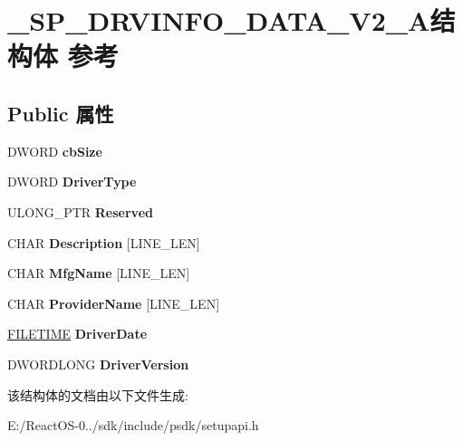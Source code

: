 \hypertarget{struct___s_p___d_r_v_i_n_f_o___d_a_t_a___v2___a}{}\section{\+\_\+\+S\+P\+\_\+\+D\+R\+V\+I\+N\+F\+O\+\_\+\+D\+A\+T\+A\+\_\+\+V2\+\_\+\+A结构体 参考}
\label{struct___s_p___d_r_v_i_n_f_o___d_a_t_a___v2___a}
\subsection*{Public 属性}
\begin{DoxyCompactItemize}
\item 
\mbox{\label{struct___s_p___d_r_v_i_n_f_o___d_a_t_a___v2___a_a2c6a6716f0a719d3f139a5f640356c9c}} 
D\+W\+O\+RD {\bfseries cb\+Size}
\item 
\mbox{\label{struct___s_p___d_r_v_i_n_f_o___d_a_t_a___v2___a_aa7d12cbd28a733abe24a8021cd836991}} 
D\+W\+O\+RD {\bfseries Driver\+Type}
\item 
\mbox{\label{struct___s_p___d_r_v_i_n_f_o___d_a_t_a___v2___a_a7f7d325142fc6d3ca09c727be30d73e6}} 
U\+L\+O\+N\+G\+\_\+\+P\+TR {\bfseries Reserved}
\item 
\mbox{\label{struct___s_p___d_r_v_i_n_f_o___d_a_t_a___v2___a_a1b92181e4b47020e864b9055dc78a9f3}} 
C\+H\+AR {\bfseries Description} \mbox{[}L\+I\+N\+E\+\_\+\+L\+EN\mbox{]}
\item 
\mbox{\label{struct___s_p___d_r_v_i_n_f_o___d_a_t_a___v2___a_af51ae52dff1a0d8631a52abc9640ffaa}} 
C\+H\+AR {\bfseries Mfg\+Name} \mbox{[}L\+I\+N\+E\+\_\+\+L\+EN\mbox{]}
\item 
\mbox{\label{struct___s_p___d_r_v_i_n_f_o___d_a_t_a___v2___a_a83cff1a3a721be0a962215243e390c10}} 
C\+H\+AR {\bfseries Provider\+Name} \mbox{[}L\+I\+N\+E\+\_\+\+L\+EN\mbox{]}
\item 
\mbox{\label{struct___s_p___d_r_v_i_n_f_o___d_a_t_a___v2___a_a05980bf66b9c022efd3ccc849492c089}} 
\hyperlink{struct___f_i_l_e_t_i_m_e}{F\+I\+L\+E\+T\+I\+ME} {\bfseries Driver\+Date}
\item 
\mbox{\label{struct___s_p___d_r_v_i_n_f_o___d_a_t_a___v2___a_a10755c83b27403b9fc08330665467bc2}} 
D\+W\+O\+R\+D\+L\+O\+NG {\bfseries Driver\+Version}
\end{DoxyCompactItemize}


该结构体的文档由以下文件生成\+:\begin{DoxyCompactItemize}
\item 
E\+:/\+React\+O\+S-\/0../sdk/include/psdk/setupapi.\+h\end{DoxyCompactItemize}
